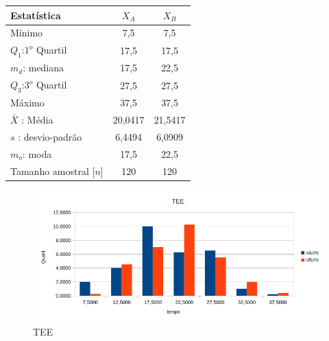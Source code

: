 \begin{minipage}[!b]{0.40\linewidth}
	\begin{tabular}{ l c c }
		\hline
		Estatística & $X_A$ & $X_B$ \\
		\hline
		Mínimo & 7,5 & 7,5\\
		$Q_1$:$1^o$ Quartil & 17,5 & 17,5 \\
		$m_d$: mediana & 17,5 & 22,5\\
		$Q_3$:$3^o$ Quartil & 27,5 & 27,5 \\
		Máximo & 37,5 & 37,5 \\
		\hline
		$\bar{X}$ : Média & 20,0417 & 21,5417 \\
		$s$ : desvio-padrão & 6,4494 & 6,0909\\
		$m_o$: moda & 17,5 & 22,5\\
		\hline
		Tamanho amostral [$n$] & 120 & 120 \\
		\hline
	\end{tabular}
	\label{Tab:Resultados}
\end{minipage}
\hspace{2cm}
\begin{minipage}[!b]{0.40\linewidth}
	\begin{figure}[H]
		\centering
		\includegraphics[scale=0.5]{./image/ESTAT/TEE.png}
		\caption{TEE}
		\label{TEE}
	\end{figure}
\end{minipage}
\newline
\vspace{1cm}
\newline
